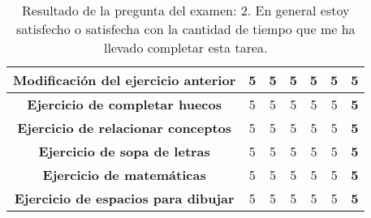 \begin{table}[H]
{\begin{tabular}{c|cccccc|}
            \multicolumn{1}{|c|}{\textbf{Modificación del ejercicio anterior}} & \multicolumn{1}{c|}{5}                                                                                                                                                                 & \multicolumn{1}{c|}{5}                  & \multicolumn{1}{c|}{5}                  & \multicolumn{1}{c|}{5}                  & \multicolumn{1}{c|}{5}                  & \textbf{5}     \\ \hline
            \multicolumn{1}{|c|}{\textbf{Ejercicio de completar huecos}}       & \multicolumn{1}{c|}{5}                                                                                                                                                                 & \multicolumn{1}{c|}{5}                  & \multicolumn{1}{c|}{5}                  & \multicolumn{1}{c|}{5}                  & \multicolumn{1}{c|}{5}                  & \textbf{5}     \\ \hline
            \multicolumn{1}{|c|}{\textbf{Ejercicio de relacionar conceptos}}   & \multicolumn{1}{c|}{5}                                                                                                                                                                 & \multicolumn{1}{c|}{5}                  & \multicolumn{1}{c|}{5}                  & \multicolumn{1}{c|}{5}                  & \multicolumn{1}{c|}{5}                  & \textbf{5}     \\ \hline
            \multicolumn{1}{|c|}{\textbf{Ejercicio de sopa de letras}}         & \multicolumn{1}{c|}{5}                                                                                                                                                                 & \multicolumn{1}{c|}{5}                  & \multicolumn{1}{c|}{5}                  & \multicolumn{1}{c|}{5}                  & \multicolumn{1}{c|}{5}                  & \textbf{5}     \\ \hline
            \multicolumn{1}{|c|}{\textbf{Ejercicio de matemáticas}}            & \multicolumn{1}{c|}{5}                                                                                                                                                                 & \multicolumn{1}{c|}{5}                  & \multicolumn{1}{c|}{5}                  & \multicolumn{1}{c|}{5}                  & \multicolumn{1}{c|}{5}                  & \textbf{5}     \\ \hline
            \multicolumn{1}{|c|}{\textbf{Ejercicio de espacios para dibujar}}  & \multicolumn{1}{c|}{5}                                                                                                                                                                 & \multicolumn{1}{c|}{5}                  & \multicolumn{1}{c|}{5}                  & \multicolumn{1}{c|}{5}                  & \multicolumn{1}{c|}{5}                  & \textbf{5}     \\ \hline
        \end{tabular}%
    }
    \caption{Resultado de la pregunta del examen: 2. En general estoy satisfecho o satisfecha con la cantidad de tiempo que me ha llevado completar esta tarea.}
    \label{tab:Pregunta2}
\end{table}

